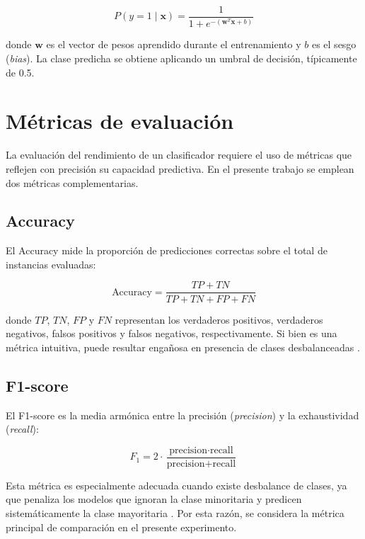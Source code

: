 \begin{equation}
    P(y = 1 \mid \mathbf{x}) = \frac{1}{1 + e^{-(\mathbf{w}^T \mathbf{x} + b)}}
\end{equation}

donde $\mathbf{w}$ es el vector de pesos aprendido durante el entrenamiento
y $b$ es el sesgo (\textit{bias}). La clase predicha se obtiene aplicando
un umbral de decisión, típicamente de 0.5.

\section{Métricas de evaluación}

La evaluación del rendimiento de un clasificador requiere el uso de métricas
que reflejen con precisión su capacidad predictiva. En el presente trabajo
se emplean dos métricas complementarias.

\subsection{Accuracy}

El Accuracy mide la proporción de predicciones correctas sobre el total de
instancias evaluadas:

\begin{equation}
    \text{Accuracy} = \frac{TP + TN}{TP + TN + FP + FN}
\end{equation}

donde $TP$, $TN$, $FP$ y $FN$ representan los verdaderos positivos,
verdaderos negativos, falsos positivos y falsos negativos, respectivamente.
Si bien es una métrica intuitiva, puede resultar engañosa en presencia de
clases desbalanceadas \parencite{japkowicz2002}.

\subsection{F1-score}

El F1-score es la media armónica entre la precisión (\textit{precision}) y
la exhaustividad (\textit{recall}):

\begin{equation}
    F_1 = 2 \cdot \frac{\text{precision} \cdot \text{recall}}
    {\text{precision} + \text{recall}}
\end{equation}

Esta métrica es especialmente adecuada cuando existe desbalance de clases,
ya que penaliza los modelos que ignoran la clase minoritaria y predicen
sistemáticamente la clase mayoritaria \parencite{japkowicz2002}. Por esta
razón, se considera la métrica principal de comparación en el presente
experimento.
